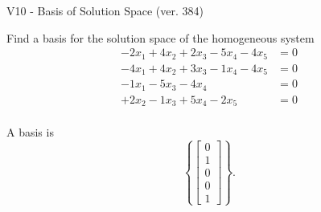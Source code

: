 \begin{exercise}
  \begin{exerciseTitle}V10 - Basis of Solution Space (ver. 384)\end{exerciseTitle}
  \begin{exerciseStatement}
    Find a basis for the solution space of the homogeneous system 
\begin{align*}
 -2 x_ 1 + 4 x_ 2 + 2 x_ 3 -5 x_ 4 -4 x_ 5 &= 0  \\ 
  -4 x_ 1 + 4 x_ 2 + 3 x_ 3 -1 x_ 4 -4 x_ 5 &= 0  \\ 
  -1 x_ 1 -5 x_ 3 -4 x_ 4 &= 0  \\ 
  + 2 x_ 2 -1 x_ 3 + 5 x_ 4 -2 x_ 5 &= 0  \\ 
 \end{align*}


 
  \end{exerciseStatement}

  \begin{exerciseAnswer}
   A basis is   
\[\left\{\left[\begin{array}{c}
0 \\
1 \\
0 \\
0 \\
1
\end{array}\right]\right\}.\]

  


  \end{exerciseAnswer}
\end{exercise}